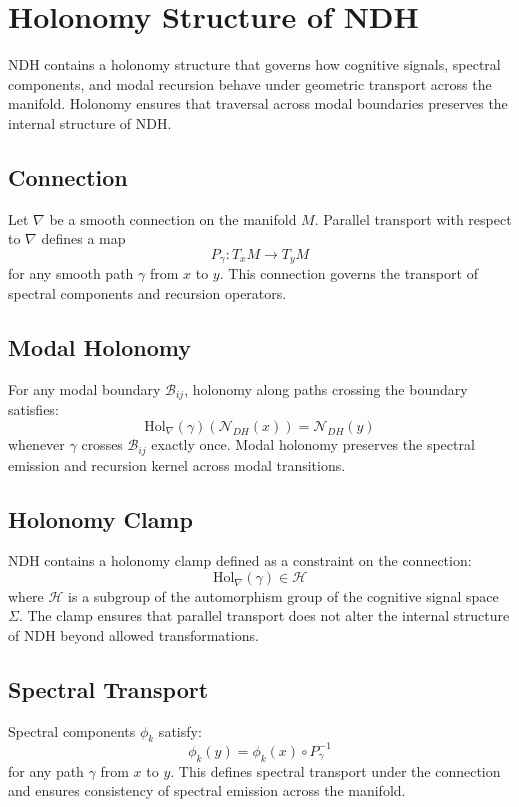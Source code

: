 \section{Holonomy Structure of NDH}
\label{sec:ndh-holonomy}

NDH contains a holonomy structure that governs how cognitive signals, spectral
components, and modal recursion behave under geometric transport across the
manifold. Holonomy ensures that traversal across modal boundaries preserves the
internal structure of NDH.

\subsection{Connection}

Let $\nabla$ be a smooth connection on the manifold $M$. Parallel transport with
respect to $\nabla$ defines a map
\[
P_\gamma : T_x M \to T_y M
\]
for any smooth path $\gamma$ from $x$ to $y$. This connection governs the
transport of spectral components and recursion operators.

\subsection{Modal Holonomy}

For any modal boundary $\mathcal{B}_{ij}$, holonomy along paths crossing the
boundary satisfies:
\[
\text{Hol}_\nabla(\gamma)(\mathcal{N}_{DH}(x)) = \mathcal{N}_{DH}(y)
\]
whenever $\gamma$ crosses $\mathcal{B}_{ij}$ exactly once. Modal holonomy
preserves the spectral emission and recursion kernel across modal transitions.

\subsection{Holonomy Clamp}

NDH contains a holonomy clamp defined as a constraint on the connection:
\[
\text{Hol}_\nabla(\gamma) \in \mathcal{H}
\]
where $\mathcal{H}$ is a subgroup of the automorphism group of the cognitive
signal space $\Sigma$. The clamp ensures that parallel transport does not alter
the internal structure of NDH beyond allowed transformations.

\subsection{Spectral Transport}

Spectral components $\phi_k$ satisfy:
\[
\phi_k(y) = \phi_k(x) \circ P_\gamma^{-1}
\]
for any path $\gamma$ from $x$ to $y$. This defines spectral transport under the
connection and ensures consistency of spectral emission across the manifold.

